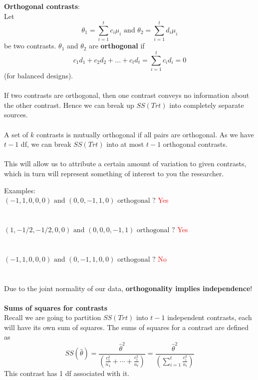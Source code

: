 \textbf{Orthogonal contrasts}:\\
Let 
$$\theta_1=\sum_{i=1}^{t}c_i\mu_i \mbox{    and    }\theta_2=\sum_{i=1}^{t}d_i\mu_i$$
be two contrasts.  $\theta_1$ and $\theta_2$ are \textbf{orthogonal} if 
$$c_1d_1+c_2d_2+...+c_td_t=\sum_{i=1}^{t}c_id_i=0$$
(for balanced designs).\\~\\
If two contrasts are orthogonal, then one contrast conveys no information about the other contrast.  Hence we can break up $SS(Trt)$ into completely separate sources.\\~\\
A set of $k$ contrasts is mutually orthogonal if all pairs are orthogonal. As we have $t-1$ df, we can break $SS(Trt)$ into at most $t-1$ orthogonal contrasts.\\~\\
This will allow us to attribute a certain amount of variation to given contrasts, which in turn will represent something of interest to you the researcher.

\newpage

Examples:\\
$ (-1,1,0,0,0) \mbox{ and } (0,0,-1,1,0) \mbox{ orthogonal ?}$ \textcolor{red}{Yes}\\~\\~\\
$ (1,-1/2,-1/2,0,0) \mbox{ and } (0,0,0,-1,1) \mbox{ orthogonal ?}$ \textcolor{red}{Yes}\\~\\~\\
$ (-1,1,0,0,0) \mbox{ and } (0,-1,1,0,0) \mbox{ orthogonal ?}$ \textcolor{red}{No}\\~\\~\\
Due to the joint normality of our data, \textbf{orthogonality implies independence}!  \\~\\

\textbf{Sums of squares for contrasts}\\
Recall we are going to partition $SS(Trt)$ into $t-1$ independent contrasts, each will have its own sum of squares.  The sums of squares for a contrast are defined as
$$ SS(\hat\theta)=\frac{\hat\theta^2}{\left(\frac{c_1^2}{n_1}+\cdots+\frac{c_t^2}{n_t}\right)}=\frac{\hat\theta^2}{\left(\sum_{i=1}^{t}\frac{c_i^2}{n_i}\right)}$$
This contrast has 1 df associated with it.\\~\\

